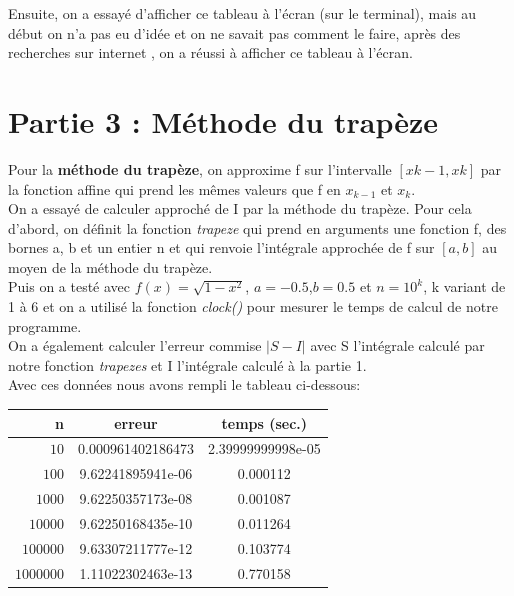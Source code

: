 \documentclass{article}
\begin{document}
Ensuite, on a essayé d'afficher ce tableau à l'écran (sur le terminal), mais au début on n'a pas eu d'idée et on ne savait pas comment le faire, après des recherches sur internet , on a réussi à afficher ce tableau à l'écran.

\section{Partie 3 : Méthode du trapèze}


	Pour la\textbf { méthode du trapèze}, on approxime f sur l'intervalle $[x{k-1},x{k}]$ par la fonction affine qui prend les mêmes valeurs que f en $x_{k-1}$ et $x_k$.\\

	On a essayé de calculer approché de I par la méthode du trapèze. Pour cela d'abord, on définit la fonction \textit{trapeze} qui prend en arguments une fonction f, des bornes a, b et un entier n et qui renvoie l'intégrale approchée de f sur $[a,b]$ au moyen de la méthode du trapèze.\\

	Puis on a testé avec $f(x)= \sqrt{1 - x^2}$, $a=-0.5 $,$b=0.5$ et $ n=10^{k}$, k variant de 1 à 6 et on a utilisé la fonction \textit{clock()} pour mesurer le temps de calcul de notre programme. \\ On a également calculer l'erreur commise $\vert S - I \vert $ avec S l'intégrale calculé par notre fonction \textit{trapezes} et I l'intégrale calculé à la partie 1. \\ 

Avec ces données nous avons rempli le tableau ci-dessous:


\begin{center}
\begin{tabular}{r | c | c}
{n} & erreur & temps (sec.)\\
\hline
$10$ & {0.000961402186473} & {2.39999999998e-05}\\
$100$ & {9.62241895941e-06} & {0.000112}\\
$1000$ & {9.62250357173e-08} & {0.001087}\\
$10000$ & {9.62250168435e-10} & {0.011264}\\
$100000$ & {9.63307211777e-12} & {0.103774}\\
$1000000$ & {1.11022302463e-13} & {0.770158}
\end{tabular}
\end{center}
\end{document}
